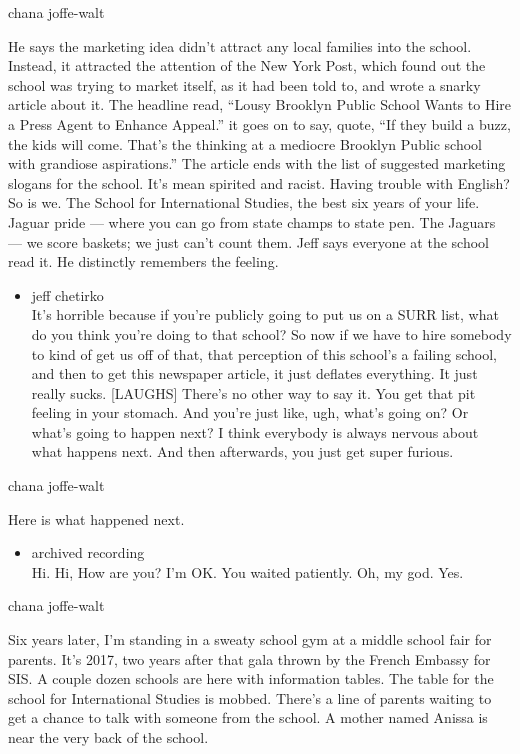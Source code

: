 chana joffe-walt

He says the marketing idea didn't attract any local families into the
school. Instead, it attracted the attention of the New York Post, which
found out the school was trying to market itself, as it had been told
to, and wrote a snarky article about it. The headline read, ``Lousy
Brooklyn Public School Wants to Hire a Press Agent to Enhance Appeal.''
it goes on to say, quote, ``If they build a buzz, the kids will come.
That's the thinking at a mediocre Brooklyn Public school with grandiose
aspirations.'' The article ends with the list of suggested marketing
slogans for the school. It's mean spirited and racist. Having trouble
with English? So is we. The School for International Studies, the best
six years of your life. Jaguar pride --- where you can go from state
champs to state pen. The Jaguars --- we score baskets; we just can't
count them. Jeff says everyone at the school read it. He distinctly
remembers the feeling.

\begin{itemize}
\tightlist
\item
  jeff chetirko\\
  It's horrible because if you're publicly going to put us on a SURR
  list, what do you think you're doing to that school? So now if we have
  to hire somebody to kind of get us off of that, that perception of
  this school's a failing school, and then to get this newspaper
  article, it just deflates everything. It just really sucks.
  {[}LAUGHS{]} There's no other way to say it. You get that pit feeling
  in your stomach. And you're just like, ugh, what's going on? Or what's
  going to happen next? I think everybody is always nervous about what
  happens next. And then afterwards, you just get super furious.
\end{itemize}

chana joffe-walt

Here is what happened next.

\begin{itemize}
\tightlist
\item
  archived recording\\
  Hi. Hi, How are you? I'm OK. You waited patiently. Oh, my god. Yes.
\end{itemize}

chana joffe-walt

Six years later, I'm standing in a sweaty school gym at a middle school
fair for parents. It's 2017, two years after that gala thrown by the
French Embassy for SIS. A couple dozen schools are here with information
tables. The table for the school for International Studies is mobbed.
There's a line of parents waiting to get a chance to talk with someone
from the school. A mother named Anissa is near the very back of the
school.

